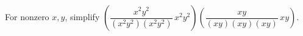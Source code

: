 For nonzero $x,y$, simplify $\left(\dfrac{x^2y^2}{(x^2y^2)(x^2y^2)}\,x^2y^2\right)\left(\dfrac{xy}{(xy)(xy)(xy)}\,xy\right)$.
